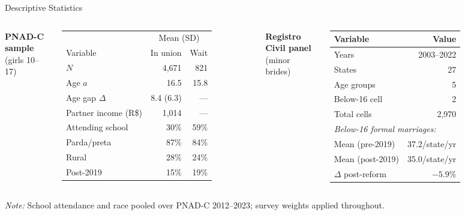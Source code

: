 \begin{frame}{Descriptive Statistics}
    \begin{columns}[T]
        \centering
        \textbf{PNAD-C sample} (girls 10--17)

        \vspace{0.2cm}
        \small
        \begin{tabular}{lrr}
            \toprule
            & \multicolumn{2}{c}{Mean (SD)} \\
            \cmidrule{2-3}
            Variable & In union & Wait \\
            \midrule
            $N$ & 4{,}671 & 821 \\
            Age $a$ & 16.5 & 15.8 \\
            Age gap $\Delta$ & 8.4 (6.3) & --- \\
            Partner income (R\$) & 1{,}014 & --- \\
            Attending school & 30\% & 59\% \\
            Parda/preta & 87\% & 84\% \\
            Rural & 28\% & 24\% \\
            Post-2019 & 15\% & 19\% \\
            \bottomrule
        \end{tabular}

        \centering
        \textbf{Registro Civil panel} (minor brides)

        \vspace{0.2cm}
        \small
        \begin{tabular}{lr}
            \toprule
            Variable & Value \\
            \midrule
            Years & 2003--2022 \\
            States & 27 \\
            Age groups & 5 \\
            Below-16 cell & 2 \\
            Total cells & 2{,}970 \\
            \midrule
            \multicolumn{2}{l}{\textit{Below-16 formal marriages:}} \\
            Mean (pre-2019) & 37.2/state/yr \\
            Mean (post-2019) & 35.0/state/yr \\
            $\Delta$ post-reform & $-5.9\%$ \\
            \bottomrule
        \end{tabular}
    \end{columns}

    \vspace{0.2cm}
    \small\textit{Note:} School attendance and race pooled over PNAD-C 2012--2023;
    survey weights applied throughout.
\end{frame}

